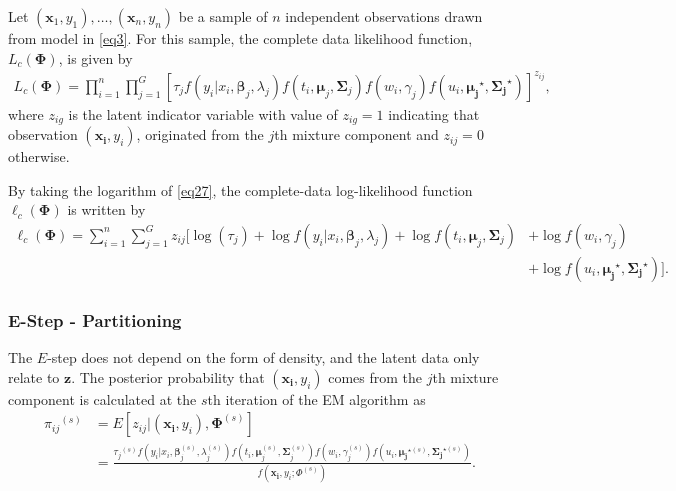 \documentclass[11pt,letterpaper]{article}
\numberwithin{equation}{section}
\numberwithin{equation}{section}
\numberwithin{equation}{section}
\begin{document}
Let $(\bm x_1, y_1),\ldots, (\bm x_n, y_n)$ be a sample of $n$ independent observations drawn from model in \eqref{eq3}.
For this sample, the complete data likelihood function, $L_c(\bm\Phi)$, is given by
\begin{align}
L_c(\bm\Phi)=\prod_{i=1}^{n}\prod_{j=1}^{G}\left[{\tau_j}f(y_i|x_i, \bm \beta_j, \lambda_{j})f(t_i, \bm\mu_j, \bm\Sigma_j) f(w_i, \gamma_j)f(u_i, \bm{\mu_j}^\star,\bm{\Sigma_j}^\star) \right]^{z_{ij}},
\label{eq27}
\end{align}
where $z_{ig}$ is the latent indicator variable with value of $z_{ig}=1$ indicating that observation $(\bm{x_i}, y_i)$, originated from the $j$th mixture component and $z_{ij}=0$ otherwise.

By taking the logarithm of \eqref{eq27}, the complete-data log-likelihood function $\ell_c(\bm\Phi)$ is written by
\begin{equation*}\begin{split}
\ell_c(\bm\Phi)= \sum_{i=1}^{n}\sum_{j=1}^{G}{z_{ij}}\big[\log(\tau_{j}) + \log{f}(y_i|x_i,\bm \beta_j,\lambda_j)+ \log f(t_i, \bm\mu_j, \bm\Sigma_j) & + \log f(w_i, \gamma_j)\\& +\log {f}(u_i, \bm{\mu_j}^\star,\bm{\Sigma_j}^\star) \big].
\label{eq28}
\end{split}\end{equation*}

\subsubsection{E-Step - Partitioning}
The $E$-step does not depend on the form of density, and the latent data only relate to $\bm z$. %
The posterior probability that $(\bm{x_i}, y_i)$ comes from the $j$th mixture component is calculated at the $s$th iteration of the EM algorithm as
\begin{equation*}\begin{split}
    {\pi_{ij}}^{(s)} &= {E}[z_{ij} |(\bm{x_i}, y_i), \bm{\Phi}^{(s)}]\\
     &= \frac{{\tau_j}^{(s)}f(y_i|x_i, \bm \beta_j^{(s)}, \lambda^{(s)}_{j})f(t_i, \bm\mu_j^{(s)}, \bm\Sigma_j^{(s)}) f(w_i, \gamma_j^{(s)})f(u_i, \bm{\mu_j}^{\star (s)},\bm{\Sigma_j}^{\star (s)})}{f(\bm{x_i}, y_i; \Phi^{(s)})
\label{eq29}                       }.
\end{split}\end{equation*}
\end{document}
